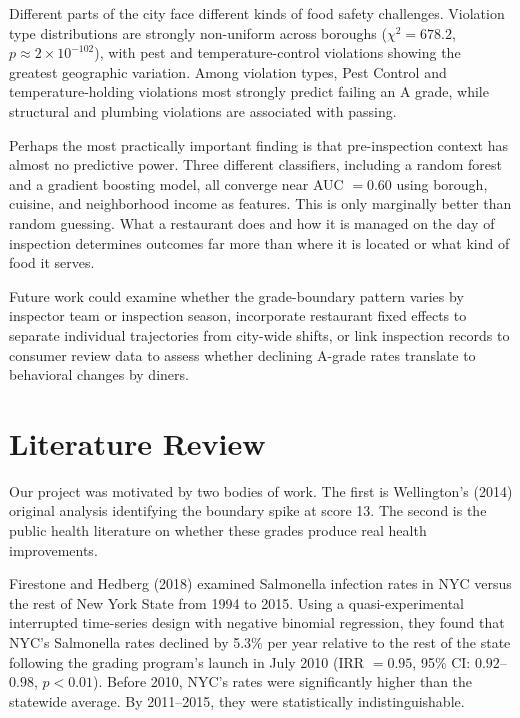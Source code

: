 \documentclass[11pt, twocolumn]{article}
\begin{document}
Different parts of the city face different kinds of food safety challenges.
Violation type distributions are strongly non-uniform across boroughs
($\chi^2 = 678.2$, $p \approx 2 \times 10^{-102}$), with pest and
temperature-control violations showing the greatest geographic variation.
Among violation types, Pest Control and temperature-holding violations
most strongly predict failing an A grade, while structural and plumbing
violations are associated with passing.

Perhaps the most practically important finding is that pre-inspection
context has almost no predictive power. Three different classifiers,
including a random forest and a gradient boosting model, all converge
near AUC $= 0.60$ using borough, cuisine, and neighborhood income as
features. This is only marginally better than random guessing. What a
restaurant does and how it is managed on the day of inspection determines
outcomes far more than where it is located or what kind of food it serves.

Future work could examine whether the grade-boundary pattern varies by
inspector team or inspection season, incorporate restaurant fixed effects
to separate individual trajectories from city-wide shifts, or link
inspection records to consumer review data to assess whether declining
A-grade rates translate to behavioral changes by diners.

\clearpage
\onecolumn
\appendix

\section{Literature Review}

Our project was motivated by two bodies of work. The first is Wellington's
(2014) original analysis identifying the boundary spike at score 13.
The second is the public health literature on whether these grades produce
real health improvements.

Firestone and Hedberg (2018) examined Salmonella infection rates in NYC
versus the rest of New York State from 1994 to 2015. Using a
quasi-experimental interrupted time-series design with negative binomial
regression, they found that NYC's Salmonella rates declined by 5.3\% per
year relative to the rest of the state following the grading program's
launch in July 2010 (IRR $= 0.95$, 95\% CI: $0.92$--$0.98$, $p < 0.01$).
Before 2010, NYC's rates were significantly higher than the statewide
average. By 2011--2015, they were statistically indistinguishable.
\end{document}
